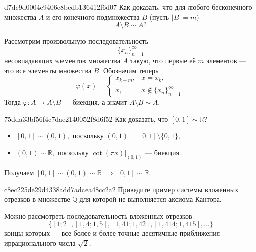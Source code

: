     \begin{note}{d7dc9d0004e9406e8bedb136412f6d07}
        Как доказать, что для любого бесконечного множества \( A \) и его конечного
        подмножества \( B \) (пусть \( |B| = m \)) \[
            A \setminus B \sim  A?
        \]

        \begin{cloze}{1}
            Рассмотрим произвольную последовательность \[
                \{ x_n \}_{n = 1} ^{\infty }
            \] несовпадающих элементов множества \( A \) такую, что первые её \( m \)
            элементов --- это все элементы множества \( B. \) Обозначим теперь \[
                \varphi(x) = \begin{cases}
                    x_{k + m}, & x = x_k, \\
                    x, & x \not\in \{ x_n \}_{n = 1}^{\infty }.
                \end{cases}
            \] Тогда \( \varphi : A \to A \setminus B \) --- биекция, а значит
            \( A \setminus B \sim A. \)
        \end{cloze}
    \end{note}

    \begin{note}{75dda33bf56f4c7dae2140052f8d6f52}
        Как доказать, что \( [0, 1] \sim \mathbb R  \)?

        \begin{cloze}{1}
            \begin{itemize}
                \item \( [0, 1] \sim (0, 1),  \) поскольку \( (0, 1) = [0, 1]
                    \setminus \{ 0, 1 \},  \)
                \item \( (0, 1) \sim \mathbb R, \)  поскольку \( \cot (\pi
                    x)|_{(0, 1)} \) --- биекция.
            \end{itemize}
            Получаем \( [0, 1] \sim (0, 1) \sim \mathbb R \implies [0, 1] \sim
            \mathbb R. \)
        \end{cloze}
    \end{note}

    \begin{note}{c8ec225de29d4338add7adcea48cc2a2}
        Приведите пример системы вложенных отрезков в множестве \( \mathbb Q  \)
        для которой не выполняется аксиома Кантора.

        \begin{cloze}{1}
            Можно рассмотреть последовательность вложенных отрезков \[
                \{ [1;2], [1{,}4;1{,}5], [1{,}41;1{,}42],
                    [1{,}414;1{,}415],\ldots \}
            \] концы которых --- все более и более точные десятичные приближения
            иррационального числа \( \sqrt{2}. \)
        \end{cloze}
    \end{note}

